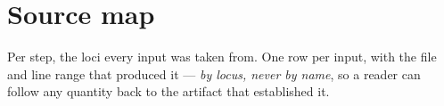 \chapter{Source map}\label{app:source-map}

Per step, the loci every input was taken from. One row per input, with the file
and line range that produced it --- \emph{by locus, never by name}, so a reader
can follow any quantity back to the artifact that established it.
